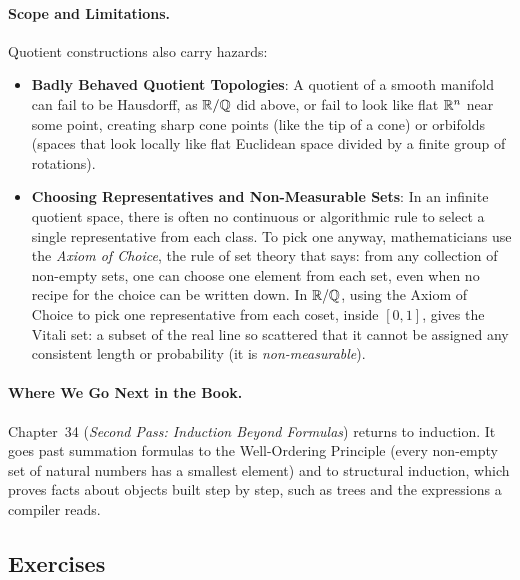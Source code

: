 \paragraph{Scope and Limitations.}
Quotient constructions also carry hazards:
\begin{itemize}
  \item \textbf{Badly Behaved Quotient Topologies}: A quotient of a smooth manifold can fail to be Hausdorff, as $\mathbb{R}/\mathbb{Q}$ did above, or fail to look like flat $\mathbb{R}^n$ near some point, creating sharp cone points (like the tip of a cone) or orbifolds (spaces that look locally like flat Euclidean space divided by a finite group of rotations).
  \item \textbf{Choosing Representatives and Non-Measurable Sets}: In an infinite quotient space, there is often no continuous or algorithmic rule to select a single representative from each class. To pick one anyway, mathematicians use the \emph{Axiom of Choice}, the rule of set theory that says: from any collection of non-empty sets, one can choose one element from each set, even when no recipe for the choice can be written down. In $\mathbb{R}/\mathbb{Q}$, using the Axiom of Choice to pick one representative from each coset, inside $[0, 1]$, gives the Vitali set: a subset of the real line so scattered that it cannot be assigned any consistent length or probability (it is \emph{non-measurable}).
\end{itemize}

\paragraph{Where We Go Next in the Book.}
Chapter~34 (\emph{Second Pass: Induction Beyond Formulas}) returns to induction. It goes past summation formulas to the Well-Ordering Principle (every non-empty set of natural numbers has a smallest element) and to structural induction, which proves facts about objects built step by step, such as trees and the expressions a compiler reads.

\subsection{Exercises}

